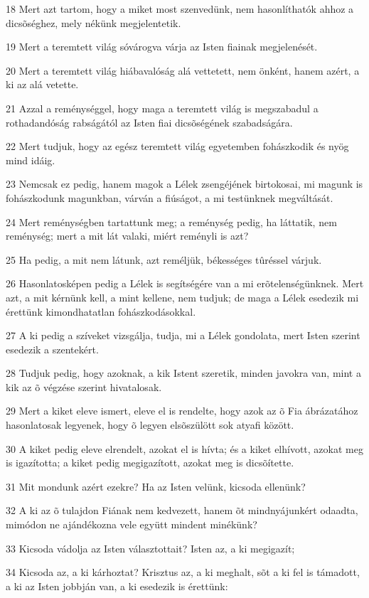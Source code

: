 \par 18 Mert azt tartom, hogy a miket most szenvedünk, nem hasonlíthatók ahhoz a dicsõséghez, mely nékünk megjelentetik.
\par 19 Mert a teremtett világ sóvárogva várja az Isten fiainak megjelenését.
\par 20 Mert a teremtett világ hiábavalóság alá vettetett, nem önként, hanem azért, a ki az alá vetette.
\par 21 Azzal a reménységgel, hogy maga a teremtett világ is megszabadul a rothadandóság rabságától az Isten fiai dicsõségének szabadságára.
\par 22 Mert tudjuk, hogy az egész teremtett világ egyetemben fohászkodik és nyög mind idáig.
\par 23 Nemcsak ez pedig, hanem magok a Lélek zsengéjének birtokosai, mi magunk is fohászkodunk magunkban, várván a fiúságot, a mi testünknek megváltását.
\par 24 Mert reménységben tartattunk meg; a reménység pedig, ha láttatik, nem reménység; mert a mit lát valaki, miért reményli is azt?
\par 25 Ha pedig, a mit nem látunk, azt reméljük, békességes tûréssel várjuk.
\par 26 Hasonlatosképen pedig a Lélek is segítségére van a mi erõtelenségünknek. Mert azt, a mit kérnünk kell, a mint kellene, nem tudjuk; de maga a Lélek esedezik mi érettünk kimondhatatlan fohászkodásokkal.
\par 27 A ki pedig a szíveket vizsgálja, tudja, mi a Lélek gondolata, mert Isten szerint esedezik a szentekért.
\par 28 Tudjuk pedig, hogy azoknak, a kik Istent szeretik, minden javokra van, mint a kik az õ végzése szerint hivatalosak.
\par 29 Mert a kiket eleve ismert, eleve el is rendelte, hogy azok az õ Fia ábrázatához hasonlatosak legyenek, hogy õ legyen elsõszülött  sok atyafi között.
\par 30 A kiket pedig eleve elrendelt, azokat el is hívta; és a kiket elhívott, azokat meg is igazította; a kiket pedig megigazított, azokat meg is dicsõítette.
\par 31 Mit mondunk azért ezekre? Ha az Isten velünk, kicsoda ellenünk?
\par 32 A ki az õ tulajdon Fiának nem kedvezett, hanem õt mindnyájunkért odaadta, mimódon ne ajándékozna vele együtt mindent minékünk?
\par 33 Kicsoda vádolja az Isten választottait? Isten az, a ki megigazít;
\par 34 Kicsoda az, a ki kárhoztat? Krisztus az, a ki meghalt, sõt a ki fel is támadott, a ki az Isten jobbján van, a ki esedezik is  érettünk:
